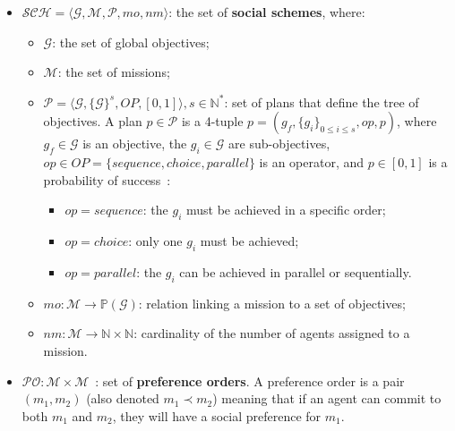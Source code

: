        \begin {itemize}
  \item $\mathcal{SCH} = \langle\mathcal{G}, \mathcal{M}, \mathcal{P}, mo, nm \rangle$: the set of \textbf{social schemes}, where:
        \begin{itemize}
          \item $\mathcal{G}$: the set of global objectives;
          \item $\mathcal{M}$: the set of missions;
          \item $\mathcal{P} = \langle \mathcal{G}, \{\mathcal{G}\}^s, OP, [0,1] \rangle, s \in \mathbb{N}^*$: set of plans that define the tree of objectives.
                A plan $p \in \mathcal{P}$ is a 4-tuple $p = (g_f, \{g_i\}_{0 \leq i \leq s}, op, p)$, where $g_f \in \mathcal{G}$ is an objective, the $g_i \in \mathcal{G}$ are sub-objectives, $op \in OP = \{sequence, choice, parallel\}$ is an operator, and $p \in [0,1]$ is a probability of success~:
                \begin{itemize}
                  \item $op = sequence$: the $g_i$ must be achieved in a specific order;
                  \item $op = choice$: only one $g_i$ must be achieved;
                  \item $op = parallel$: the $g_i$ can be achieved in parallel or sequentially.
                \end{itemize}
          \item $mo: \mathcal{M} \rightarrow \mathbb{P}(\mathcal{G})$: relation linking a mission to a set of objectives;
          \item $nm: \mathcal{M} \rightarrow \mathbb{N} \times \mathbb{N}$: cardinality of the number of agents assigned to a mission.
                \end {itemize}
          \item $\mathcal{PO}: \mathcal{M} \times \mathcal{M} $~: set of \textbf{preference orders}. A preference order is a pair $(m_1, m_2)$ (also denoted $m_1 \prec m_2$) meaning that if an agent can commit to both $m_1$ and $m_2$, they will have a social preference for $m_1$.
        \end{itemize}

        \medskip

